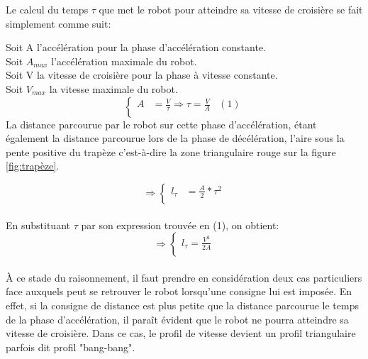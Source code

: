 \documentclass[a4paper,11pt]{article}
\begin{document}
Le calcul du temps $\tau$ que met le robot pour atteindre sa vitesse de croisière se fait simplement comme suit:
\newline

\noindent Soit A l'accélération pour la phase d'accélération constante.\\
Soit $A_{max}$ l'accélération maximale du robot.\\
Soit V la vitesse de croisière pour la phase à vitesse constante.\\
Soit $V_{max}$ la vitesse maximale du robot.
\begin{equation*}
    \left\{
        \begin{aligned}
            A & = \frac{V}{\tau} \Rightarrow \tau = \frac{V}{A}  & (1)\\ 
           \end{aligned}
    \right.
\end{equation*}
La distance parcourue par le robot sur cette phase d'accélération, étant également la distance parcourue lors de la phase de décélération, l'aire sous la pente positive du trapèze c'est-à-dire la zone triangulaire rouge sur la figure \ref{fig:trapèze}.

\begin{equation*}
    \Rightarrow\left\{
        \begin{aligned}
        l_{\tau} & = \frac{A}{2}*\tau^2\\
           \end{aligned}
    \right.
\end{equation*}\\
En substituant $\tau$ par son expression trouvée en (1), on obtient:
\begin{equation*}
    \Rightarrow\left\{
        \begin{aligned}
        l_{\tau} = \frac{V^2}{2A}\\
           \end{aligned}
    \right.
\end{equation*}\\
À ce stade du raisonnement, il faut prendre en considération deux cas particuliers face auxquels peut se retrouver le robot lorsqu'une consigne lui est imposée. En effet, si la consigne de distance est plus petite que la distance parcourue le temps de la phase d'accélération, il paraît évident que le robot ne pourra atteindre sa vitesse de croisière. Dans ce cas, le profil de vitesse devient un profil triangulaire parfois dit profil "bang-bang".\cite{chemori_generation_nodate}\\\\
\end{document}
